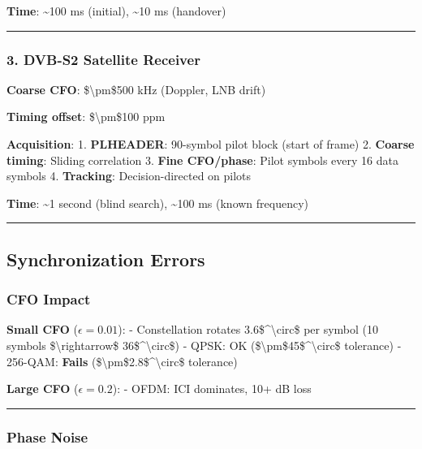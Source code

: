 \textbf{Time}: \textasciitilde100 ms (initial), \textasciitilde10 ms
(handover)

\begin{center}\rule{0.5\linewidth}{0.5pt}\end{center}

\subsubsection{3. DVB-S2 Satellite
Receiver}\label{dvb-s2-satellite-receiver}

\textbf{Coarse CFO}: \$\textbackslash pm\$500 kHz (Doppler, LNB drift)

\textbf{Timing offset}: \$\textbackslash pm\$100 ppm

\textbf{Acquisition}: 1. \textbf{PLHEADER}: 90-symbol pilot block (start
of frame) 2. \textbf{Coarse timing}: Sliding correlation 3. \textbf{Fine
CFO/phase}: Pilot symbols every 16 data symbols 4. \textbf{Tracking}:
Decision-directed on pilots

\textbf{Time}: \textasciitilde1 second (blind search),
\textasciitilde100 ms (known frequency)

\begin{center}\rule{0.5\linewidth}{0.5pt}\end{center}

\subsection{Synchronization Errors}\label{synchronization-errors}

\subsubsection{CFO Impact}\label{cfo-impact-1}

\textbf{Small CFO} (\(\epsilon = 0.01\)): - Constellation rotates
3.6\$\^{}\textbackslash circ\$ per symbol (10 symbols
\$\textbackslash rightarrow\$ 36\$\^{}\textbackslash circ\$) - QPSK: OK
(\$\textbackslash pm\$45\$\^{}\textbackslash circ\$ tolerance) -
256-QAM: \textbf{Fails}
(\$\textbackslash pm\$2.8\$\^{}\textbackslash circ\$ tolerance)

\textbf{Large CFO} (\(\epsilon = 0.2\)): - OFDM: ICI dominates, 10+ dB
loss

\begin{center}\rule{0.5\linewidth}{0.5pt}\end{center}

\subsubsection{Phase Noise}\label{phase-noise}


